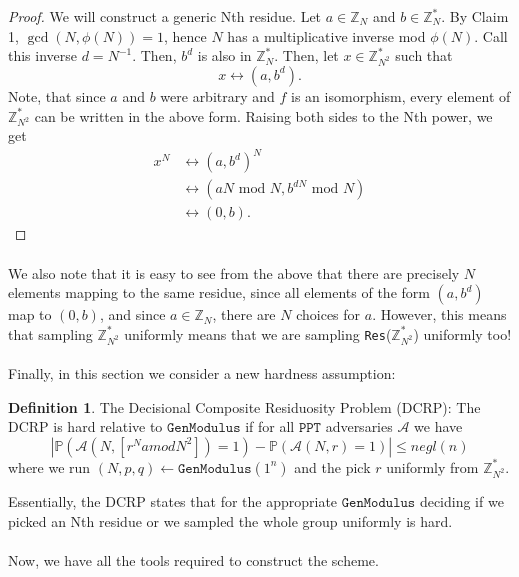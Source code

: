 \documentclass{article}
\theoremstyle{definition}
\newtheorem{definition}{Definition}[section]
\theoremstyle{example}
\newcommand{\A}{\mathcal{A}}
\newcommand{\Prob}{\mathbb{P}}
\newcommand{\Int}{\mathbb{Z}}
\newcommand{\PPT}{\texttt{PPT}}
\renewcommand{\mod}{\,\,\text{mod}\,\,}
\newcommand{\GenModulus}{\texttt{GenModulus}}
\begin{document}
\begin{proof}
  We will construct a generic Nth residue. Let $a \in \Int_N$ and $b \in
  \Int_N^*$. By Claim 1, $\gcd(N, \phi(N)) = 1$, hence $N$ has a multiplicative
  inverse mod $\phi(N)$. Call this inverse $d = N^{-1}$. Then, $b^d$ is also in $\Int_N^*$. Then, let $x \in \Int_{N^2}^*$ such
  that
  \[
    x \leftrightarrow (a, b^d).
  \] 
  Note, that since $a$ and $b$ were arbitrary and $f$ is an isomorphism, every
  element of $\Int_{N^2}^*$ can be written in the above form. Raising both sides
  to the Nth power, we get
  \begin{align*}
    x^N &\leftrightarrow (a, b^d)^N \\
        &\leftrightarrow (aN \mod N, b^{dN} \mod N) \\
        &\leftrightarrow (0, b).
  \end{align*}
\end{proof}
\paragraph{} We also note that it is easy to see from the above that there are
precisely $N$ elements mapping to the same residue, since all elements of the
form $(a, b^d)$ map to $(0, b)$, and since $a\in \Int_N$, there are $N$ choices
for $a$. However, this means that sampling $\Int_{N^2}^*$ uniformly means that
we are sampling \texttt{Res}($\Int_{N^2}^*$) uniformly too!
\paragraph{} Finally, in this section we consider a new hardness assumption:
   \begin{definition}{The Decisional Composite Residuosity Problem (DCRP):} The
     DCRP is hard relative to $\GenModulus$ if for all $\PPT$ adversaries $\A$
     we have
     \[
       \left| \Prob(\A(N, [r^N amod N^2]) = 1) - \Prob(\A(N, r) = 1) \right|
       \leq negl(n)
     \]
     where we run $(N, p, q) \leftarrow\GenModulus(1^n)$ and the pick $r$
     uniformly from $\Int_{N^2}^*$.
   \end{definition}
   Essentially, the DCRP states that for the appropriate $\GenModulus$ deciding
   if we picked an Nth residue or we sampled the whole group uniformly is hard.
\paragraph{} Now, we have all the tools required to construct the scheme.
\end{document}
